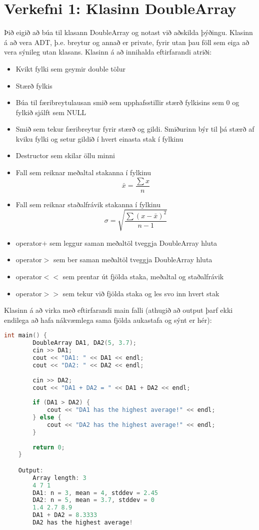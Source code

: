 \documentclass[11pt,a4paper]{article}
\begin{document}
\section*{Verkefni 1: Klasinn DoubleArray}
Þið eigið að búa til klasann DoubleArray og notast við aðskilda þýðingu. Klasinn á að vera ADT, þ.e. breytur og annað er private, fyrir utan þau föll sem eiga að vera sýnileg utan klasans. Klasinn á að innihalda eftirfarandi atriði:
\begin{itemize}
	\item Kvikt fylki sem geymir double tölur
	\item Stærð fylkis
	\item Búa til færibreytulausan smið sem upphafsstillir stærð fylkisins sem 0 og fylkið sjálft sem NULL
	\item Smið sem tekur færibreytur fyrir stærð og gildi. Smiðurinn býr til þá stærð af kviku fylki og setur gildið í hvert einasta stak í fylkinu
	\item Destructor sem skilar öllu minni
	\item Fall sem reiknar meðaltal stakanna í fylkinu
	\[
	 	\bar{x} = \frac{\sum{x}}{n}
	\]
	\item Fall sem reiknar staðalfrávik stakanna í fylkinu
	\[
	 	\sigma = \sqrt{\frac{\sum\left(x - \bar{x}\right)^2}{n - 1}}
	\]
	\item operator$+$ sem leggur saman meðaltöl tveggja DoubleArray hluta
	\item operator$>$ sem ber saman meðaltöl tveggja DoubleArray hluta
	\item operator$<<$ sem prentar út fjölda staka, meðaltal og staðalfrávik
	\item operator$>>$ sem tekur við fjölda staka og les svo inn hvert stak
\end{itemize}
Klasinn á að virka með eftirfarandi main falli (athugið að output þarf ekki endilega að hafa nákvæmlega sama fjölda aukastafa og sýnt er hér):

\begin{lstlisting}[language=C++, caption = Example]
	int main() {
    	DoubleArray DA1, DA2(5, 3.7);
    	cin >> DA1;
    	cout << "DA1: " << DA1 << endl;
    	cout << "DA2: " << DA2 << endl;
    	
    	cin >> DA2;
    	cout << "DA1 + DA2 = " << DA1 + DA2 << endl;
    	
    	if (DA1 > DA2) {
    		cout << "DA1 has the highest average!" << endl;
    	} else {
    		cout << "DA2 has the highest average!" << endl;
    	}
    	
    	return 0;
    }

    Output:
    	Array length: 3
    	4 7 1
    	DA1: n = 3, mean = 4, stddev = 2.45
    	DA2: n = 5, mean = 3.7, stddev = 0
    	1.4 2.7 8.9
    	DA1 + DA2 = 8.3333
    	DA2 has the highest average!
\end{lstlisting}
\end{document}
